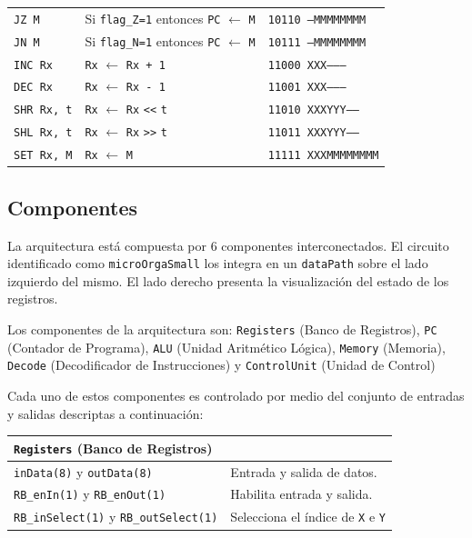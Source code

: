 \documentclass[a4paper,11pt]{article}
\begin{document}
\begin{center}
\begin{tabular}{l|l|l}
\texttt{JZ M}          & Si \texttt{flag\_Z=1} entonces \texttt{PC} $\leftarrow$ \texttt{M} & \texttt{10110 ---MMMMMMMM} \\  %
\texttt{JN M}          & Si \texttt{flag\_N=1} entonces \texttt{PC} $\leftarrow$ \texttt{M} & \texttt{10111 ---MMMMMMMM} \\  %
\hline
\texttt{INC Rx}        & \texttt{Rx} $\leftarrow$ \texttt{Rx + 1}                           & \texttt{11000 XXX--------} \\  %
\texttt{DEC Rx}        & \texttt{Rx} $\leftarrow$ \texttt{Rx - 1}                           & \texttt{11001 XXX--------} \\  %
\texttt{SHR Rx, t}     & \texttt{Rx} $\leftarrow$ \texttt{Rx} \verb|<<| \texttt{t}          & \texttt{11010 XXXYYY-----} \\  %
\texttt{SHL Rx, t}     & \texttt{Rx} $\leftarrow$ \texttt{Rx} \verb|>>| \texttt{t}          & \texttt{11011 XXXYYY-----} \\  %
\hline
\texttt{SET Rx, M}     & \texttt{Rx} $\leftarrow$ \texttt{M}                                & \texttt{11111 XXXMMMMMMMM} \\  %
\end{tabular}
\end{center}

\subsection*{Componentes}

La arquitectura está compuesta por 6 componentes interconectados.
El circuito identificado como \texttt{microOrgaSmall} los integra en un \texttt{dataPath} sobre el lado izquierdo del mismo.
El lado derecho presenta la visualización del estado de los registros.

Los componentes de la arquitectura son: 
\texttt{Registers} (Banco de Registros),
\texttt{PC} (Contador de Programa),
\texttt{ALU} (Unidad Aritmético Lógica),
\texttt{Memory} (Memoria),
\texttt{Decode} (Decodificador de Instrucciones) y
\texttt{ControlUnit} (Unidad de Control)

Cada uno de estos componentes es controlado por medio del conjunto de entradas y salidas descriptas a continuación:

\small

\begin{center}
\begin{tabular}{p{6.4cm}|p{8.2cm}}
\texttt{Registers} (Banco de Registros)              &  \\%
\hline
\texttt{inData(8)} y \texttt{outData(8)}             & Entrada y salida de datos.\\
\texttt{RB\_enIn(1)} y \texttt{RB\_enOut(1)}         & Habilita entrada y salida.\\
\texttt{RB\_inSelect(1)} y \texttt{RB\_outSelect(1)} & Selecciona el índice de \texttt{X} e \texttt{Y}\\
\end{tabular}
\end{center}
\end{document}
